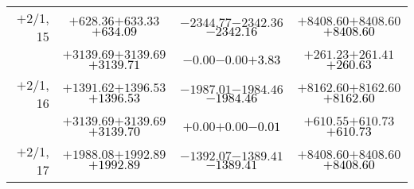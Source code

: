 \documentclass[compress]{beamer}
\begin{document}
\begin{frame}
{\begin{tabular}{r | c | c | c}
$+$2/1, 15 & $+628.36$\hspace{0.1 cm}$+633.33$\hspace{0.1 cm}\textcolor{black}{$+634.09$} & $-2344.77$\hspace{0.1 cm}$-2342.36$\hspace{0.1 cm}\textcolor{black}{$-2342.16$} & $+8408.60$\hspace{0.1 cm}$+8408.60$\hspace{0.1 cm}\textcolor{black}{$+8408.60$} \\
           & $+3139.69$\hspace{0.1 cm}$+3139.69$\hspace{0.1 cm}\textcolor{black}{$+3139.71$} & $-0.00$\hspace{0.1 cm}$-0.00$\hspace{0.1 cm}\textcolor{black}{$+3.83$} & $+261.23$\hspace{0.1 cm}$+261.41$\hspace{0.1 cm}\textcolor{black}{$+260.63$} \\
$+$2/1, 16 & $+1391.62$\hspace{0.1 cm}$+1396.53$\hspace{0.1 cm}\textcolor{black}{$+1396.53$} & $-1987.01$\hspace{0.1 cm}$-1984.46$\hspace{0.1 cm}\textcolor{black}{$-1984.46$} & $+8162.60$\hspace{0.1 cm}$+8162.60$\hspace{0.1 cm}\textcolor{black}{$+8162.60$} \\
           & $+3139.69$\hspace{0.1 cm}$+3139.69$\hspace{0.1 cm}\textcolor{black}{$+3139.70$} & $+0.00$\hspace{0.1 cm}$+0.00$\hspace{0.1 cm}\textcolor{black}{$-0.01$} & $+610.55$\hspace{0.1 cm}$+610.73$\hspace{0.1 cm}\textcolor{black}{$+610.73$} \\
$+$2/1, 17 & $+1988.08$\hspace{0.1 cm}$+1992.89$\hspace{0.1 cm}\textcolor{black}{$+1992.89$} & $-1392.07$\hspace{0.1 cm}$-1389.41$\hspace{0.1 cm}\textcolor{black}{$-1389.41$} & $+8408.60$\hspace{0.1 cm}$+8408.60$\hspace{0.1 cm}\textcolor{black}{$+8408.60$} \\

\end{tabular}}
\end{frame}
\end{document}
